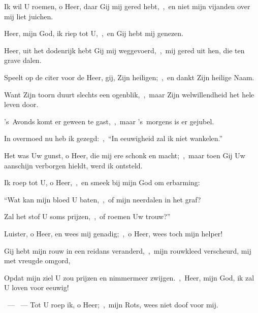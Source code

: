 \documentclass[12pt,twoside,a5paper]{article}
\begin{document}
\begin{halfparskip}
   Ik wil U roemen, o Heer, daar Gij mij gered hebt,~\sep\ en niet mijn vijanden over mij liet juichen.

  Heer, mijn God, ik riep tot U,~\sep\ en Gij hebt mij genezen.

  Heer, uit het dodenrijk hebt Gij mij weggevoerd,~\sep\ mij gered uit hen, die ten grave dalen.

  Speelt op de citer voor de Heer, gij, Zijn heiligen;~\sep\ en dankt Zijn heilige Naam.

  Want Zijn toorn duurt slechts een ogenblik,~\sep\ maar Zijn welwillendheid het hele leven door.

  's~Avonds komt er geween te gast,~\sep\ maar 's~morgens is er gejubel.

  In overmoed nu heb ik gezegd:~\sep\ ``In eeuwigheid zal ik niet wankelen.''

  Het was Uw gunst, o Heer, die mij ere schonk en macht;~\sep\ maar toen Gij Uw aanschijn verborgen hieldt, werd ik ontsteld.

  Ik roep tot U, o Heer,~\sep\ en smeek bij mijn God om erbarming:

  ``Wat kan mijn bloed U baten,~\sep\ of mijn neerdalen in het graf?

  Zal het stof U soms prijzen,~\sep\ of roemen Uw trouw?''

  Luister, o Heer, en wees mij genadig;~\sep\ o Heer, wees toch mijn helper!

  Gij hebt mijn rouw in een reidans veranderd,~\sep\ mijn rouwkleed verscheurd, mij met vreugde omgord,

  Opdat mijn ziel U zou prijzen en nimmermeer zwijgen.~\sep\ Heer, mijn God, ik zal U loven voor eeuwig!
\end{halfparskip}

\begin{halfparskip}
  ~--- ~---  Tot U roep ik, o Heer;~\sep\ mijn Rots, wees niet doof voor mij.
\end{halfparskip}

\begin{halfparskip}
   
\end{halfparskip}
\end{document}
